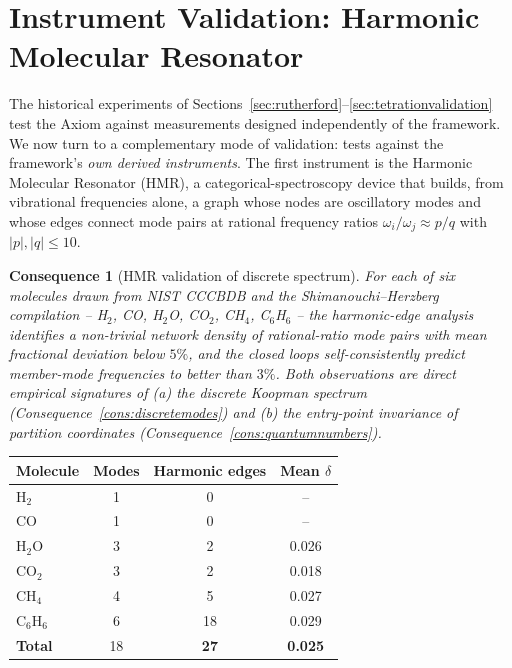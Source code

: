 \documentclass[11pt,twocolumn,a4paper]{article}
\theoremstyle{axiomstyle}
\theoremstyle{conseqstyle}
\newtheorem{consequence}{Consequence}
\theoremstyle{definition}
\theoremstyle{remark}
\begin{document}
\section{Instrument Validation: Harmonic Molecular Resonator}
\label{sec:hmrvalidation}

The historical experiments of Sections~\ref{sec:rutherford}--\ref{sec:tetrationvalidation} test the Axiom against measurements designed independently of the framework. We now turn to a complementary mode of validation: tests against the framework's \emph{own derived instruments}. The first instrument is the Harmonic Molecular Resonator (HMR), a categorical-spectroscopy device that builds, from vibrational frequencies alone, a graph whose nodes are oscillatory modes and whose edges connect mode pairs at rational frequency ratios $\omega_{i}/\omega_{j}\approx p/q$ with $|p|,|q|\leq 10$.

\begin{consequence}[HMR validation of discrete spectrum]\label{cons:hmrvalidation}
For each of six molecules drawn from NIST CCCBDB and the Shimanouchi--Herzberg compilation -- H$_{2}$, CO, H$_{2}$O, CO$_{2}$, CH$_{4}$, C$_{6}$H$_{6}$ -- the harmonic-edge analysis identifies a non-trivial network density of rational-ratio mode pairs with mean fractional deviation below $5\%$, and the closed loops self-consistently predict member-mode frequencies to better than $3\%$. Both observations are direct empirical signatures of (a) the discrete Koopman spectrum (Consequence~\ref{cons:discretemodes}) and (b) the entry-point invariance of partition coordinates (Consequence~\ref{cons:quantumnumbers}).
\end{consequence}

\begin{center}\small
\begin{tabular}{lccc}
\toprule
Molecule & Modes & Harmonic edges & Mean $\delta$\\
\midrule
H$_{2}$    & 1 & 0  & --     \\
CO         & 1 & 0  & --     \\
H$_{2}$O   & 3 & 2  & 0.026  \\
CO$_{2}$   & 3 & 2  & 0.018  \\
CH$_{4}$   & 4 & 5  & 0.027  \\
C$_{6}$H$_{6}$ & 6 & 18 & 0.029  \\
\midrule
\textbf{Total} & 18 & \textbf{27} & \textbf{0.025}\\
\bottomrule
\end{tabular}
\end{center}
\end{document}
